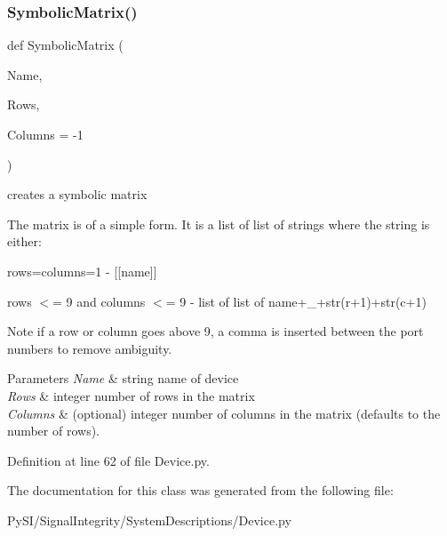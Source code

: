 \mbox{\label{classSignalIntegrity_1_1SystemDescriptions_1_1Device_1_1Device_a2c70eb13042897e97cc142e6a0f69300}} 
\subsubsection{\texorpdfstring{Symbolic\+Matrix()}{SymbolicMatrix()}}
{\footnotesize\ttfamily def Symbolic\+Matrix (\begin{DoxyParamCaption}\item[{}]{Name,  }\item[{}]{Rows,  }\item[{}]{Columns = {\ttfamily -\/1} }\end{DoxyParamCaption})\hspace{0.3cm}{\ttfamily [static]}}



creates a symbolic matrix 

The matrix is of a simple form. It is a list of list of strings where the string is either\+:
\begin{DoxyItemize}
\item rows=columns=1 -\/ \mbox{[}\mbox{[}name\mbox{]}\mbox{]}
\item rows $<$= 9 and columns $<$= 9 -\/ list of list of name+\textquotesingle{}\+\_\+\textquotesingle{}+str(r+1)+str(c+1) \begin{DoxyNote}{Note}
if a row or column goes above 9, a comma is inserted between the port numbers to remove ambiguity. 
\end{DoxyNote}

\begin{DoxyParams}{Parameters}
{\em Name} & string name of device \\
\hline
{\em Rows} & integer number of rows in the matrix \\
\hline
{\em Columns} & (optional) integer number of columns in the matrix (defaults to the number of rows). \\
\hline
\end{DoxyParams}

\end{DoxyItemize}

Definition at line 62 of file Device.\+py.



The documentation for this class was generated from the following file\+:\begin{DoxyCompactItemize}
\item 
Py\+S\+I/\+Signal\+Integrity/\+System\+Descriptions/Device.\+py\end{DoxyCompactItemize}
